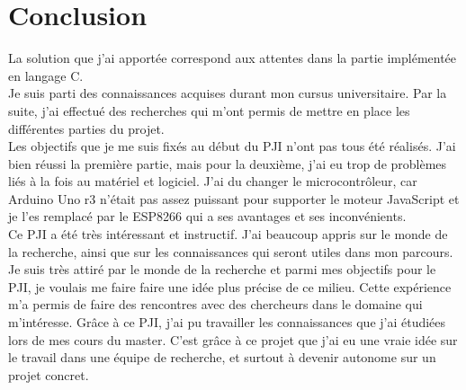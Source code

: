 \section{Conclusion}

La solution que j'ai apportée correspond aux attentes dans la partie implémentée en langage C.\\

Je suis parti des connaissances acquises durant mon cursus universitaire. Par la suite, j'ai effectué des recherches qui m'ont permis de mettre en place les différentes parties du projet.\\

Les objectifs que je me suis fixés au début du PJI n'ont pas tous été réalisés. J'ai bien réussi la première partie, mais  pour la deuxième, j'ai eu trop de problèmes liés à la fois au matériel et logiciel. J'ai du changer le microcontrôleur, car Arduino Uno r3 n’était pas assez puissant pour supporter le moteur JavaScript et je l'es remplacé par le ESP8266 qui a ses avantages et ses inconvénients.\\

Ce PJI a été très intéressant et instructif. J'ai beaucoup appris sur le monde  de la recherche, ainsi que sur les connaissances qui seront utiles dans mon parcours.
Je suis très attiré par le monde de la recherche et parmi mes objectifs pour le PJI, je voulais me faire faire une idée plus précise de ce milieu. Cette expérience m'a permis de faire des rencontres avec des chercheurs dans le domaine qui m'intéresse. 
Grâce à ce PJI, j'ai pu travailler les connaissances que j'ai étudiées lors de mes cours du master.
C'est grâce à ce projet que j'ai eu une vraie idée sur le travail dans une équipe de recherche, et surtout à devenir autonome sur un projet concret.   
\newpage